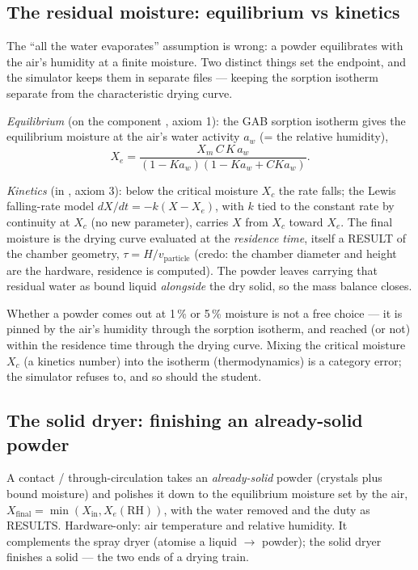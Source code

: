 \documentclass[11pt,a4paper]{article}
\begin{document}
\subsection{The residual moisture: equilibrium vs kinetics}

The ``all the water evaporates'' assumption is wrong: a powder
equilibrates with the air's humidity at a finite moisture.  Two
distinct things set the endpoint, and the simulator keeps them in
separate files --- keeping the sorption isotherm separate
from the characteristic drying curve.

\emph{Equilibrium} (on the component , axiom 1): the GAB
sorption isotherm gives the equilibrium moisture at the air's water
activity $a_w$ (= the relative humidity),
\begin{equation}
   X_e = \frac{X_m\,C\,K\,a_w}{(1-K a_w)(1-K a_w + C K a_w)}.
\end{equation}

\emph{Kinetics} (in , axiom 3): below the
critical moisture $X_c$ the rate falls; the Lewis falling-rate model
$dX/dt = -k(X-X_e)$, with $k$ tied to the constant rate by continuity
at $X_c$ (no new parameter), carries $X$ from $X_c$ toward $X_e$.  The
final moisture is the drying curve evaluated at the \emph{residence
time}, itself a RESULT of the chamber geometry, $\tau = H/v_{\text{particle}}$
(credo: the chamber diameter and height are the hardware, residence is
computed).  The powder leaves carrying that residual water as bound
liquid \emph{alongside} the dry solid, so the mass balance closes.

\begin{intuition}
Whether a powder comes out at 1\,\% or 5\,\% moisture is not a free
choice --- it is pinned by the air's humidity through the sorption
isotherm, and reached (or not) within the residence time through the
drying curve.  Mixing the critical moisture $X_c$ (a kinetics number)
into the isotherm (thermodynamics) is a category error; the simulator
refuses to, and so should the student.
\end{intuition}

\subsection{The solid dryer: finishing an already-solid powder}

A contact / through-circulation  takes an
\emph{already-solid} powder (crystals plus bound moisture) and polishes
it down to the equilibrium moisture set by the air,
$X_{\text{final}} = \min(X_{\text{in}}, X_e(\text{RH}))$, with the
water removed and the duty as RESULTS.  Hardware-only: air temperature
and relative humidity.  It complements the spray dryer (atomise a
liquid $\to$ powder); the solid dryer finishes a solid --- the two ends
of a drying train.
\end{document}
